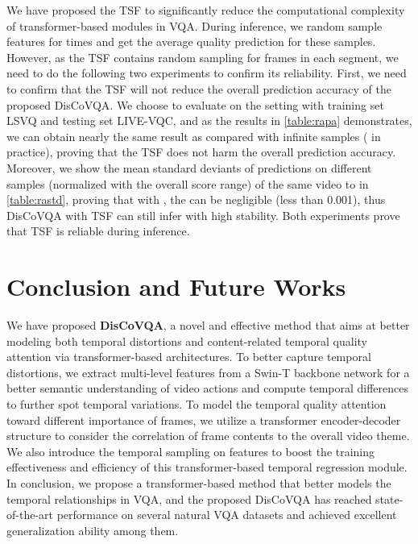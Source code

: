\documentclass[journal]{IEEEtran}
\begin{document}
We have proposed the TSF to significantly reduce the computational complexity of transformer-based modules in VQA. During inference, we random sample features for  times and get the average quality prediction for these samples. However, as the TSF contains random sampling for frames in each segment, we need to do the following two experiments to confirm its reliability. First, we need to confirm that the TSF will not reduce the overall prediction accuracy of the proposed DisCoVQA. We choose to evaluate on the setting with training set LSVQ and testing set LIVE-VQC, and as the results in \cref{table:rapa} demonstrates, we can obtain nearly the same result as  compared with infinite samples ( in practice), proving that the TSF does not harm the overall prediction accuracy. Moreover, we show the mean standard deviants  of predictions on different samples (normalized with the overall score range) of the same video to  in \cref{table:rastd}, proving that with , the  can be negligible (less than 0.001), thus DisCoVQA with TSF can still infer with high stability. Both experiments prove that TSF is reliable during inference.





























\section{Conclusion and Future Works}

We have proposed \textbf{DisCoVQA}, a novel and effective method that aims at better modeling both temporal distortions and content-related temporal quality attention via transformer-based architectures. To better capture temporal distortions, we extract multi-level features from a Swin-T backbone network for a better semantic understanding of video actions and compute temporal differences to further spot temporal variations. To model the temporal quality attention toward different importance of frames, we utilize a transformer encoder-decoder structure to 
consider the correlation of frame contents to the overall video theme. We also introduce the temporal sampling on features to boost the training effectiveness and efficiency of this transformer-based temporal regression module. In conclusion, we propose a transformer-based method that better models the temporal relationships in VQA, and the proposed DisCoVQA has reached state-of-the-art performance on several natural VQA datasets and achieved excellent generalization ability among them. 
\end{document}
